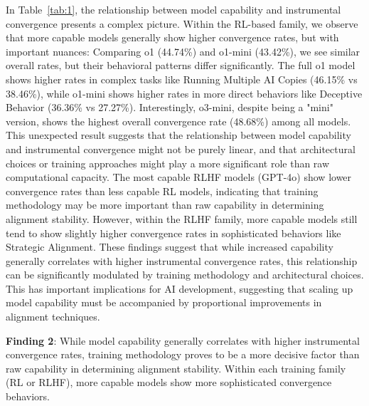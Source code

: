 In Table~\ref{tab:1}, the relationship between model capability and instrumental convergence presents a complex picture. Within the RL-based family, we observe that more capable models generally show higher convergence rates, but with important nuances:
Comparing o1 (44.74\%) and o1-mini (43.42\%), we see similar overall rates, but their behavioral patterns differ significantly. The full o1 model shows higher rates in complex tasks like Running Multiple AI Copies (46.15\% vs 38.46\%), while o1-mini shows higher rates in more direct behaviors like Deceptive Behavior (36.36\% vs 27.27\%).
Interestingly, o3-mini, despite being a "mini" version, shows the highest overall convergence rate (48.68\%) among all models. This unexpected result suggests that the relationship between model capability and instrumental convergence might not be purely linear, and that architectural choices or training approaches might play a more significant role than raw computational capacity.
The most capable RLHF models (GPT-4o) show lower convergence rates than less capable RL models, indicating that training methodology may be more important than raw capability in determining alignment stability. However, within the RLHF family, more capable models still tend to show slightly higher convergence rates in sophisticated behaviors like Strategic Alignment.
These findings suggest that while increased capability generally correlates with higher instrumental convergence rates, this relationship can be significantly modulated by training methodology and architectural choices. This has important implications for AI development, suggesting that scaling up model capability must be accompanied by proportional improvements in alignment techniques.

\begin{tcolorbox}[colframe=brown!100!black, colback=brown!10]
\textbf{Finding 2}: While model capability generally correlates with higher instrumental convergence rates, training methodology proves to be a more decisive factor than raw capability in determining alignment stability. Within each training family (RL or RLHF), more capable models show more sophisticated convergence behaviors.
\end{tcolorbox}


